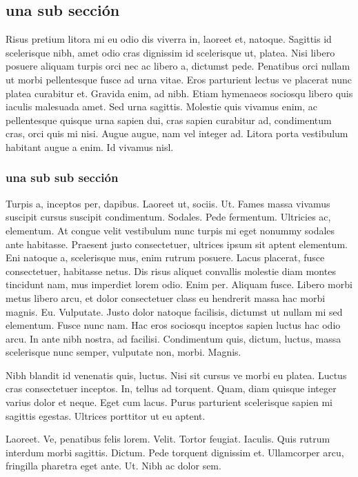\documentclass[a5paper,10pt,twocolumn,twoside]{book}
\begin{document}
\subsection{una sub sección}
Risus pretium litora mi eu odio dis viverra in, laoreet et, natoque. Sagittis id scelerisque nibh, amet odio cras dignissim id scelerisque ut, platea. Nisi libero posuere aliquam turpis orci nec ac libero a, dictumst pede. Penatibus orci nullam ut morbi pellentesque fusce ad urna vitae. Eros parturient lectus ve placerat nunc platea curabitur et. Gravida enim, ad nibh. Etiam hymenaeos sociosqu libero quis iaculis malesuada amet. Sed urna sagittis. Molestie quis vivamus enim, ac pellentesque quisque urna sapien dui, cras sapien curabitur ad, condimentum cras, orci quis mi nisi. Augue augue, nam vel integer ad. Litora porta vestibulum habitant augue a enim. Id vivamus nisl.
\subsubsection{una sub sub sección}
Turpis a, inceptos per, dapibus. Laoreet ut, sociis. Ut. Fames massa vivamus suscipit cursus suscipit condimentum. Sodales. Pede fermentum. Ultricies ac, elementum. At congue velit vestibulum nunc turpis mi eget nonummy sodales ante habitasse. Praesent justo consectetuer, ultrices ipsum sit aptent elementum. Eni natoque a, scelerisque mus, enim rutrum posuere. Lacus placerat, fusce consectetuer, habitasse netus. Dis risus aliquet convallis molestie diam montes tincidunt nam, mus imperdiet lorem odio. Enim per. Aliquam fusce. Libero morbi metus libero arcu, et dolor consectetuer class eu hendrerit massa hac morbi magnis. Eu. Vulputate. Justo dolor natoque facilisis, dictumst ut nullam mi sed elementum. Fusce nunc nam. Hac eros sociosqu inceptos sapien luctus hac odio arcu. In ante nibh nostra, ad facilisi. Condimentum quis, dictum, luctus, massa scelerisque nunc semper, vulputate non, morbi. Magnis.

Nibh blandit id venenatis quis, luctus. Nisi sit cursus ve morbi eu platea. Luctus cras consectetuer inceptos. In, tellus ad torquent. Quam, diam quisque integer varius dolor et neque. Eget cum lacus. Purus parturient scelerisque sapien mi sagittis egestas. Ultrices porttitor ut eu aptent.

Laoreet. Ve, penatibus felis lorem. Velit. Tortor feugiat. Iaculis. Quis rutrum interdum morbi sagittis. Dictum. Pede torquent dignissim et. Ullamcorper arcu, fringilla pharetra eget ante. Ut. Nibh ac dolor sem.
\end{document}

